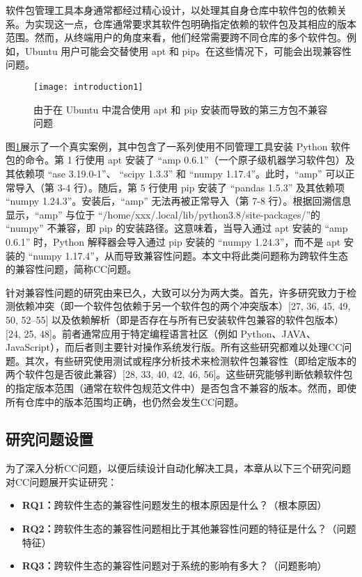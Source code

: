 软件包管理工具本身通常都经过精心设计，以处理其自身仓库中软件包的依赖关系。为实现这一点，仓库通常要求其软件包明确指定依赖的软件包及其相应的版本范围。然而，从终端用户的角度来看，他们经常需要跨不同仓库的多个软件包。例如，Ubuntu 用户可能会交替使用 apt 和 pip。在这些情况下，可能会出现兼容性问题。
\begin{figure}[htbp] %
	\centering
	\texttt{[image: introduction1]}
	\caption{由于在 Ubuntu 中混合使用 apt 和 pip 安装而导致的第三方包不兼容问题}
	\label{fig:example}
\end{figure}
图\ref{fig:example}展示了一个真实案例，其中包含了一系列使用不同管理工具安装 Python 软件包的命令。第 1 行使用 apt 安装了 “amp 0.6.1”（一个原子级机器学习软件包）及其依赖项 “ase 3.19.0-1”、 “scipy 1.3.3” 和 “numpy 1.17.4”。此时，“amp” 可以正常导入（第 3-4 行）。随后，第 5 行使用 pip 安装了 “pandas 1.5.3” 及其依赖项 “numpy 1.24.3”。安装后，“amp” 无法再被正常导入（第 7-8 行）。根据回溯信息显示，“amp” 与位于 “/home/xxx/.local/lib/python3.8/site-packages/”的 “numpy” 不兼容，即 pip 的安装路径。这意味着，当导入通过 apt 安装的 “amp 0.6.1” 时，Python 解释器会导入通过 pip 安装的 “numpy 1.24.3”，而不是 apt 安装的 “numpy 1.17.4”，从而导致兼容性问题。本文中将此类问题称为跨软件生态的兼容性问题，简称CC问题。

针对兼容性问题的研究由来已久，大致可以分为两大类。首先，许多研究致力于检测依赖冲突（即一个软件包依赖于另一个软件包的两个冲突版本）[27, 36, 45, 49, 50, 52–55] 以及依赖解析（即是否存在与所有已安装软件包兼容的软件包版本）[24, 25, 48]。前者通常应用于特定编程语言社区（例如 Python、JAVA、JavaScript），而后者则主要针对操作系统发行版。所有这些研究都难以处理CC问题。其次，有些研究使用测试或程序分析技术来检测软件包兼容性（即给定版本的两个软件包是否彼此兼容）[28, 33, 40, 42, 46, 56]。这些研究能够判断依赖软件包的指定版本范围（通常在软件包规范文件中）是否包含不兼容的版本。然而，即使所有仓库中的版本范围均正确，也仍然会发生CC问题。
\subsection{研究问题设置}
为了深入分析CC问题，以便后续设计自动化解决工具，本章从以下三个研究问题对CC问题展开实证研究：
\begin{itemize}
	\item \textbf{RQ1：}跨软件生态的兼容性问题发生的根本原因是什么？（根本原因）
	\item \textbf{RQ2：}跨软件生态的兼容性问题相比于其他兼容性问题的特征是什么？（问题特征）
	\item \textbf{RQ3：}跨软件生态的兼容性问题对于系统的影响有多大？（问题影响）
\end{itemize}

